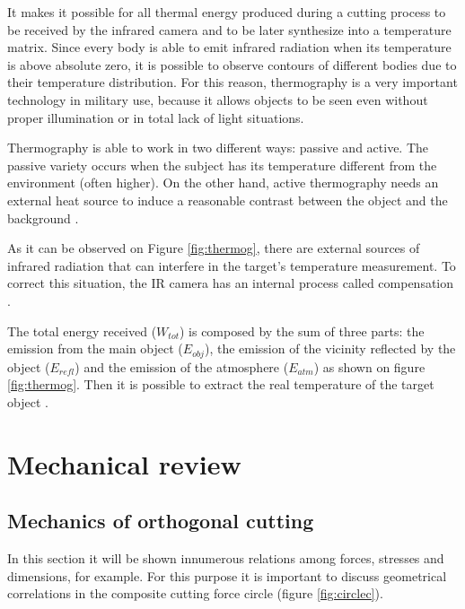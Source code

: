 	It makes it possible for all thermal energy produced during a cutting process to be received by the infrared camera and to be later synthesize into a temperature matrix. Since every body is able to emit infrared radiation when its temperature is above absolute zero, it is possible to observe contours of different bodies due to their temperature distribution. For this reason, thermography is a very important technology in military use, because it allows objects to be seen even without proper illumination or in total lack of light situations.

	Thermography is able to work in two different ways: passive and active. The passive variety occurs when the subject has its temperature different from the environment (often higher). On the other hand, active thermography needs an external heat source to induce a reasonable contrast between the object and the background \cite{maldague2000}.

	As it can be observed on Figure \ref{fig:thermog}, there are external sources of infrared radiation that can interfere in the target's temperature measurement. To correct this situation, the IR camera has an internal process called compensation \cite{usamentiaga2014}.

	The total energy received ($W_{tot}$) is composed by the sum of three parts: the emission from the main object ($E_{obj}$), the emission of the vicinity reflected by the object ($E_{refl}$) and the emission of the atmosphere ($E_{atm}$) as shown on figure \ref{fig:thermog}. Then it is possible to extract the real temperature of the target object \cite{usamentiaga2014}.


\section{Mechanical review}
	\subsection{Mechanics of orthogonal cutting}

	In this section it will be shown innumerous relations among forces, stresses and dimensions, for example. For this purpose it is important to discuss geometrical correlations in the composite cutting force circle (figure \ref{fig:circlec}).

